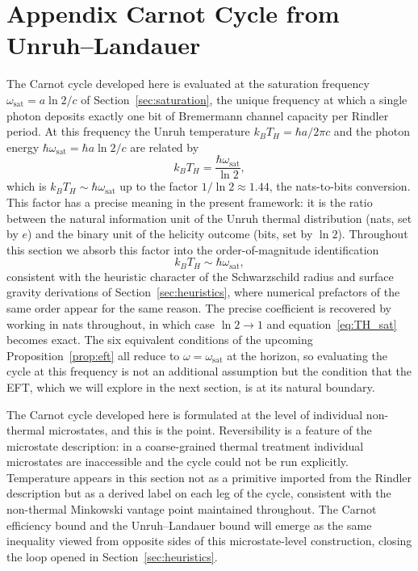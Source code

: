 \section{Appendix Carnot Cycle from Unruh--Landauer}
\label{sec:carnot}

The Carnot cycle developed here is evaluated at the saturation 
frequency $\omega_{\mathrm{sat}} = a\ln 2/c$ of 
Section~\ref{sec:saturation}, the unique frequency 
at which a single photon deposits exactly one bit 
of Bremermann channel capacity per Rindler period. 
At this frequency the Unruh temperature 
$k_BT_H = \hbar a/2\pi c$ and the photon energy 
$\hbar\omega_{\mathrm{sat}} = \hbar a\ln 2/c$ are 
related by
%
\begin{equation}
    k_BT_H = \frac{\hbar\omega_{\mathrm{sat}}}{\ln 2},
    \label{eq:TH_sat}
\end{equation}
%
which is $k_BT_H \sim \hbar\omega_{\mathrm{sat}}$ 
up to the factor $1/\ln 2 \approx 1.44$, the 
nats-to-bits conversion. This factor has a precise 
meaning in the present framework: it is the ratio 
between the natural information unit of the Unruh 
thermal distribution (nats, set by $e$) and the 
binary unit of the helicity outcome (bits, set by 
$\ln 2$). Throughout this section we absorb this 
factor into the order-of-magnitude identification
%
\begin{equation}
    k_BT_H \sim \hbar\omega_{\mathrm{sat}},
    \label{eq:TH_order}
\end{equation}
%
consistent with the heuristic character of the 
Schwarzschild radius and surface gravity 
derivations of Section~\ref{sec:heuristics}, 
where numerical prefactors of the same order 
appear for the same reason. The precise 
coefficient is recovered by working in nats 
throughout, in which case $\ln 2 \to 1$ and 
equation~\eqref{eq:TH_sat} becomes exact. The 
six equivalent conditions of the upcoming
Proposition~\ref{prop:eft} all reduce to 
$\omega = \omega_{\mathrm{sat}}$ at the horizon, 
so evaluating the cycle at this frequency is not 
an additional assumption but the condition that 
the EFT, which we will explore in the next section, is at its natural boundary.

The Carnot cycle developed here is formulated at the level of 
individual non-thermal microstates, and this is the point. 
Reversibility is a feature of the microstate description: in a 
coarse-grained thermal treatment individual microstates are 
inaccessible and the cycle could not be run explicitly. Temperature 
appears in this section not as a primitive imported from the Rindler 
description but as a derived label on each leg of the cycle, 
consistent with the non-thermal Minkowski vantage point maintained 
throughout. The Carnot efficiency bound and the Unruh--Landauer 
bound will emerge as the same inequality viewed from opposite sides 
of this microstate-level construction, closing the loop opened in 
Section~\ref{sec:heuristics}.

